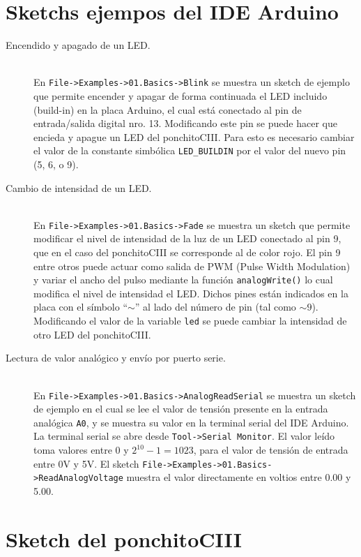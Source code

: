 \documentclass[a4paper]{article}
\begin{document}
\section{Sketchs ejempos del IDE Arduino}
\begin{description}
  \item[Encendido y apagado de un LED.]\hfill \\En \texttt{File->Examples->01.Basics->Blink} se muestra un sketch de ejemplo que permite encender y apagar de forma continuada el LED incluido (build-in) en la placa Arduino, el cual está conectado al pin de entrada/salida digital nro. 13. Modificando este pin se puede hacer que encieda y apague un LED del ponchitoCIII. Para esto es necesario cambiar el valor de la constante simbólica \texttt{LED\_BUILDIN} por el valor del nuevo pin (5, 6, o 9).
  \item[Cambio de intensidad de un LED.]\hfill \\En \texttt{File->Examples->01.Basics->Fade} se muestra un sketch que permite modificar el nivel de intensidad de la luz de un LED conectado al pin 9, que en el caso del ponchitoCIII se corresponde al de color rojo. El pin 9 entre otros puede actuar como salida de PWM (Pulse Width Modulation) y variar el ancho del pulso mediante la función \texttt{analogWrite()} lo cual modifica el nivel de intensidad el LED. Dichos pines están indicados en la placa con el símbolo ``$\sim$'' al lado del número de pin (tal como $\sim\!9$). Modificando el valor de la variable \texttt{led} se puede cambiar la intensidad de otro LED del ponchitoCIII.
  \item[Lectura de valor analógico y envío por puerto serie.]\hfill \\En \texttt{File->Examples->01.Basics->AnalogReadSerial} se muestra un sketch de ejemplo en el cual se lee el valor de tensión presente en la entrada analógica \texttt{A0}, y se muestra su valor en la terminal serial del IDE Arduino. La terminal serial se abre desde \texttt{Tool->Serial Monitor}. El valor leído toma valores entre 0 y $2^{10}-1=1023$, para el valor de tensión de entrada entre 0V y 5V. El sketch \texttt{File->Examples->01.Basics->ReadAnalogVoltage} muestra el valor directamente en voltios entre 0.00 y 5.00.
\end{description}

\section{Sketch del ponchitoCIII}
\end{document}
